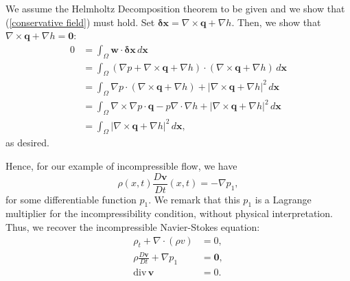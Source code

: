 \documentclass[final,10pt]{article}
\begin{document}
We assume the Helmholtz Decomposition theorem to be given and we show that (\ref{conservative field}) must hold.
Set $\bm\delta\bm x = \nabla\times\bm q + \nabla h.$
Then, we show that $\nabla\times\bm q + \nabla h = \bm 0$:
\begin{align*}
	0	&=	\int_{\Omega} \bm w \cdot \bm\delta\bm x\, d\bm x	\\
		&=	\int_{\Omega} (\nabla p + \nabla\times \bm q + \nabla h) \cdot (\nabla\times\bm q + \nabla h)\, d\bm x	\\
		&=	\int_{\Omega}\nabla p\cdot(\nabla\times \bm q + \nabla h) + |\nabla\times\bm q + \nabla h|^2\, d\bm x	\\
		&=	\int_{\Omega}\nabla\times\nabla p \cdot \bm q - p \nabla\cdot\nabla h + |\nabla\times\bm q + \nabla h|^2\, d\bm x	\\
		&=	\int_{\Omega} |\nabla\times\bm q + \nabla h|^2\, d\bm x,
\end{align*}
as desired.

Hence, for our example of incompressible flow, we have
\[
	{\rho}({x},t) \frac{D\bm v}{D t}({x},t) = -\nabla p_1,
\]
for some differentiable function $p_1$.
We remark that this $p_1$ is a Lagrange multiplier for the incompressibility condition, without physical interpretation.
Thus, we recover the incompressible Navier-Stokes equation:
\begin{align}
	\rho_t + \nabla \cdot(\rho v)			&= 0,	\tag{Conservation of Mass}\\
	{\rho} \frac{D\bm v}{D t} + \nabla {p_1}	&= \bm 0,	\tag{Least Action Principle}\\
					\mathrm{div}\, \bm v	&= 0.	\tag{Incompressibility}
\end{align}
\end{document}
